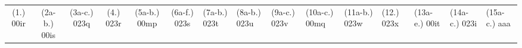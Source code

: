 \begin{eocexercises}{}
\begin{enumerate}[itemsep=5pt, label=\textbf{\arabic*}. ]
  \end{enumerate}
\practiceinfo

\begin{tabular}{cccccc}
    (1.) 00ir& (2a-b.) 00is& (3a-c.) 023q & (4.) 023r & (5a-b.) 00mp &
    (6a-f.) 023s & (7a-b.) 023t & (8a-b.) 023u & (9a-c.) 023v & (10a-c.) 00mq &
    (11a-b.) 023w & (12.) 023x & (13a-e.) 00it &(14a-c.) 023i & (15a-c.) aaa\\
  \end{tabular}
\end{eocexercises}
